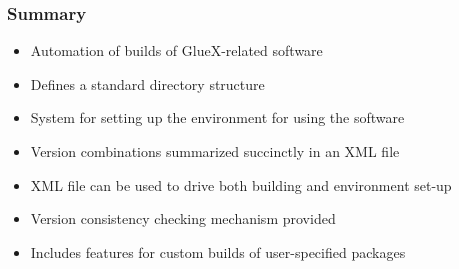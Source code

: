 \documentclass[xcolor=dvipsnames,hyperref={pdfpagelabels=false}]{beamer}
\begin{document}
\begin{frame}
  \frametitle{Summary}

\begin{itemize}
\item Automation of builds of GlueX-related software
\item Defines a standard directory structure
\item System for setting up the environment for using the software
\item Version combinations summarized succinctly in an XML file
\item XML file can be used to drive both building and environment set-up
\item Version consistency checking mechanism provided
\item Includes features for custom builds of user-specified packages
\end{itemize}
\end{frame}
\end{document}
